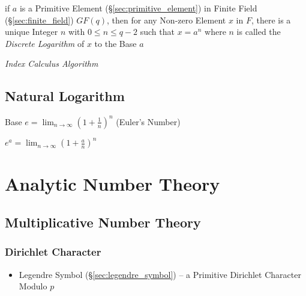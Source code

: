 if $a$ is a Primitive Element (\S\ref{sec:primitive_element}) in Finite Field
(\S\ref{sec:finite_field}) $GF(q)$, then for any Non-zero Element $x$ in $F$,
there is a unique Integer $n$ with $0 \leq n \leq q - 2$ such that $x = a^n$
where $n$ is called the \emph{Discrete Logarithm} of $x$ to the Base $a$

\emph{Index Calculus Algorithm}



\subsection{Natural Logarithm}\label{sec:natural_logarithm}

Base $e = \lim_{n \rightarrow \infty} (1 + \frac{1}{n})^n$
(Euler's Number)

$e^a = \lim_{n \rightarrow \infty} (1 + \frac{a}{n})^n$



\section{Analytic Number Theory}\label{sec:analytic_number_theory}

\subsection{Multiplicative Number Theory}
\label{sec:multiplicative_number_theory}

\subsubsection{Dirichlet Character}\label{sec:dirichlet_character}

\begin{itemize}
  \item Legendre Symbol (\S\ref{sec:legendre_symbol}) -- a Primitive Dirichlet
    Character Modulo $p$
\end{itemize}



